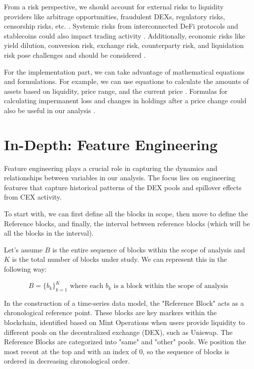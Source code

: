 \documentclass{article}
\begin{document}
From a risk perspective, we should account for external risks to liquidity providers like arbitrage opportunities, fraudulent DEXs, regulatory risks, censorship risks, etc. \cite{impermanentloss2023}. Systemic risks from interconnected DeFi protocols and stablecoins could also impact trading activity \cite{makarov2021cryptocurrencies}. Additionally, economic risks like yield dilution, conversion risk, exchange risk, counterparty risk, and liquidation risk pose challenges and should be considered \cite{yield_farming_protocols}.

For the implementation part, we can take advantage of mathematical equations and formulations. For example, we can use equations to calculate the amounts of assets based on liquidity, price range, and the current price \cite{uniswapv3math2023}. Formulas for calculating impermanent loss and changes in holdings after a price change could also be useful in our analysis \cite{uniswapv3math2023, impermanentloss2023, risksreturns2023}.

\section*{\textbf{In-Depth: Feature Engineering}}

Feature engineering plays a crucial role in capturing the dynamics and relationships between variables in our analysis. The focus lies on engineering features that capture historical patterns of the DEX pools and spillover effects from CEX activity.

To start with, we can first define all the blocks in scope, then move to define the Reference blocks, and finally, the interval between reference blocks (which will be all the blocks in the interval).

Let's assume $B$ is the entire sequence of blocks within the scope of analysis and $K$ is the total number of blocks under study. We can represent this in the following way:

\begin{equation}
B = \{b_k\}_{k=1}^{K} \text{ where each } b_k \text{ is a block within the scope of analysis}
\end{equation}

In the construction of a time-series data model, the "Reference Block" acts as a chronological reference point. These blocks are key markers within the blockchain, identified based on Mint Operations when users provide liquidity to different pools on the decentralized exchange (DEX), such as Uniswap. The Reference Blocks are categorized into "same" and "other" pools. We position the most recent at the top and with an index of 0, so the sequence of blocks is ordered in decreasing chronological order.
\end{document}
